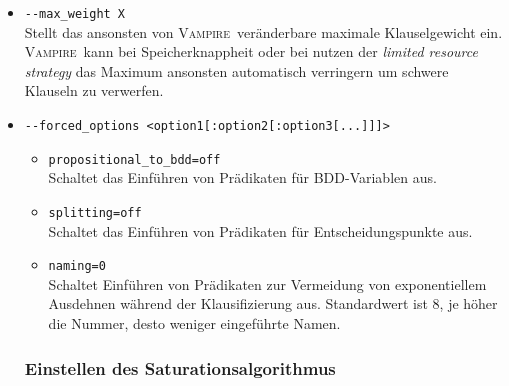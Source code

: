 \documentclass{article}
\newcommand{\vampire}{\textsc{Vampire}~}
\begin{document}
\begin{itemize}
	\item \verb|--max_weight X| \label{arg:maxweight}\\
	Stellt das ansonsten von \vampire veränderbare maximale Klauselgewicht ein. \vampire kann bei Speicherknappheit oder bei nutzen der \emph{limited resource strategy} das Maximum ansonsten automatisch verringern um schwere Klauseln zu verwerfen.
	\item \verb|--forced_options <option1[:option2[:option3[...]]]>| \label{arg:forcedoptions}
	\begin{itemize}
		\item \verb|propositional_to_bdd=off| \\
		Schaltet das Einführen von Prädikaten für BDD-Variablen aus.
		\item \verb|splitting=off| \\
		Schaltet das Einführen von Prädikaten für Entscheidungspunkte aus.
		
		{ %
		%
		}
		
		\item \verb|naming=0| \\
		Schaltet Einführen von Prädikaten zur Vermeidung von exponentiellem Ausdehnen während der Klausifizierung aus.
		Standardwert ist 8, je höher die Nummer, desto weniger eingeführte Namen.\\
	\end{itemize}

	\subsubsection{Einstellen des Saturationsalgorithmus}


\end{itemize}
\end{document}
